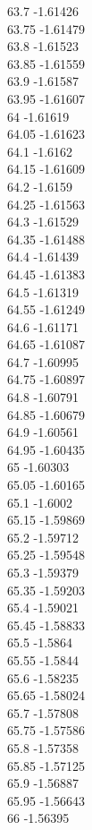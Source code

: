 {63.7	-1.61426\\
63.75	-1.61479\\
63.8	-1.61523\\
63.85	-1.61559\\
63.9	-1.61587\\
63.95	-1.61607\\
64	-1.61619\\
64.05	-1.61623\\
64.1	-1.6162\\
64.15	-1.61609\\
64.2	-1.6159\\
64.25	-1.61563\\
64.3	-1.61529\\
64.35	-1.61488\\
64.4	-1.61439\\
64.45	-1.61383\\
64.5	-1.61319\\
64.55	-1.61249\\
64.6	-1.61171\\
64.65	-1.61087\\
64.7	-1.60995\\
64.75	-1.60897\\
64.8	-1.60791\\
64.85	-1.60679\\
64.9	-1.60561\\
64.95	-1.60435\\
65	-1.60303\\
65.05	-1.60165\\
65.1	-1.6002\\
65.15	-1.59869\\
65.2	-1.59712\\
65.25	-1.59548\\
65.3	-1.59379\\
65.35	-1.59203\\
65.4	-1.59021\\
65.45	-1.58833\\
65.5	-1.5864\\
65.55	-1.5844\\
65.6	-1.58235\\
65.65	-1.58024\\
65.7	-1.57808\\
65.75	-1.57586\\
65.8	-1.57358\\
65.85	-1.57125\\
65.9	-1.56887\\
65.95	-1.56643\\
66	-1.56395\\
}
